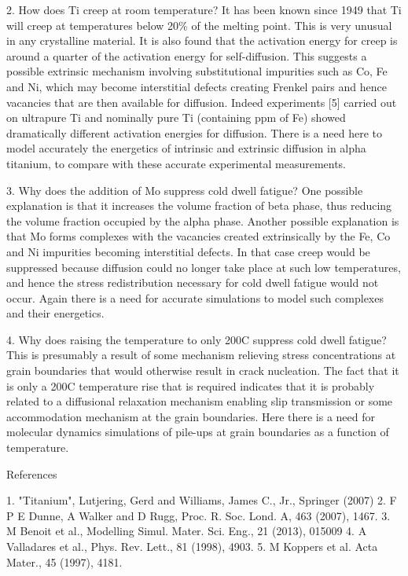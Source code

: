 2. How does Ti creep at room temperature? It has been known since 1949 that Ti will creep at temperatures below 20\% of the melting point. This is very unusual in any crystalline material. It is also found that the activation energy for creep is around a quarter of the activation energy for self-diffusion. This suggests a possible extrinsic mechanism involving substitutional impurities such as Co, Fe and Ni, which may become interstitial defects creating Frenkel pairs and hence vacancies that are then available for diffusion. Indeed experiments [5] carried out on ultrapure Ti and nominally pure Ti (containing ppm of Fe) showed dramatically different activation energies for diffusion. There is a need here to model accurately the energetics of intrinsic and extrinsic diffusion in alpha titanium, to compare with these accurate experimental measurements.

3. Why does the addition of Mo suppress cold dwell fatigue? One possible explanation is that it increases the volume fraction of beta phase, thus reducing the volume fraction occupied by the alpha phase. Another possible explanation is that Mo forms complexes with the vacancies created extrinsically by the Fe, Co and Ni impurities becoming interstitial defects. In that case creep would be suppressed because diffusion could no longer take place at such low temperatures, and hence the stress redistribution necessary for cold dwell fatigue would not occur. Again there is a need for accurate simulations to model such complexes and their energetics.

4. Why does raising the temperature to only 200C suppress cold dwell fatigue? This is presumably a result of some mechanism relieving stress concentrations at grain boundaries that would otherwise result in crack nucleation. The fact that it is only a 200C temperature rise that is required indicates that it is probably related to a diffusional relaxation mechanism enabling slip transmission or some accommodation mechanism at the grain boundaries. Here there is a need for molecular dynamics simulations of pile-ups at grain boundaries as a function of temperature.

References

1. "Titanium", Lutjering, Gerd and Williams, James C., Jr., Springer (2007)
2. F P E Dunne, A Walker and D Rugg, Proc. R. Soc. Lond. A, 463 (2007), 1467.
3. M Benoit et al., Modelling Simul. Mater. Sci. Eng., 21 (2013), 015009
4. A Valladares et al., Phys. Rev. Lett., 81 (1998), 4903.
5. M Koppers et al. Acta Mater., 45 (1997), 4181.
\fi